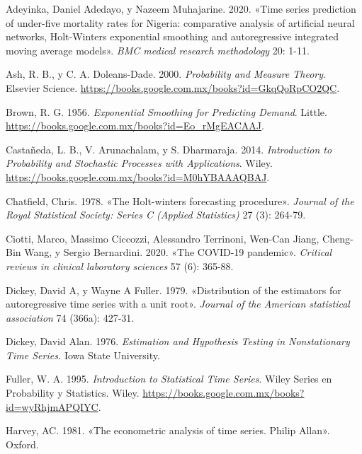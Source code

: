 \documentclass[
  us-letterpaper,
]{scrreprt}
\newlength{\cslhangindent}
\newenvironment{CSLReferences}[2] %
 {\begin{list}{}{%
  \setlength{\itemindent}{0pt}
  \setlength{\leftmargin}{0pt}
  \setlength{\parsep}{0pt}
  \ifodd #1
   \setlength{\leftmargin}{\cslhangindent}
   \setlength{\itemindent}{-1\cslhangindent}
  \fi
  \setlength{\itemsep}{#2\baselineskip}}}
 {\end{list}}
\theoremstyle{plain}
\theoremstyle{definition}
\theoremstyle{definition}
\theoremstyle{plain}
\theoremstyle{remark}
\begin{document}
\label{refs}
\begin{CSLReferences}{1}{0}
Adeyinka, Daniel Adedayo, y Nazeem Muhajarine. 2020. {«Time series
prediction of under-five mortality rates for Nigeria: comparative
analysis of artificial neural networks, Holt-Winters exponential
smoothing and autoregressive integrated moving average models»}.
\emph{BMC medical research methodology} 20: 1-11.

Ash, R. B., y C. A. Doleans-Dade. 2000. \emph{Probability and Measure
Theory}. Elsevier Science.
\url{https://books.google.com.mx/books?id=GkqQoRpCO2QC}.

Brown, R. G. 1956. \emph{Exponential Smoothing for Predicting Demand}.
Little. \url{https://books.google.com.mx/books?id=Eo_rMgEACAAJ}.

Castañeda, L. B., V. Arunachalam, y S. Dharmaraja. 2014.
\emph{Introduction to Probability and Stochastic Processes with
Applications}. Wiley.
\url{https://books.google.com.mx/books?id=M0hYBAAAQBAJ}.

Chatfield, Chris. 1978. {«The Holt-winters forecasting procedure»}.
\emph{Journal of the Royal Statistical Society: Series C (Applied
Statistics)} 27 (3): 264-79.

Ciotti, Marco, Massimo Ciccozzi, Alessandro Terrinoni, Wen-Can Jiang,
Cheng-Bin Wang, y Sergio Bernardini. 2020. {«The COVID-19 pandemic»}.
\emph{Critical reviews in clinical laboratory sciences} 57 (6): 365-88.

Dickey, David A, y Wayne A Fuller. 1979. {«Distribution of the
estimators for autoregressive time series with a unit root»}.
\emph{Journal of the American statistical association} 74 (366a):
427-31.

Dickey, David Alan. 1976. \emph{Estimation and Hypothesis Testing in
Nonstationary Time Series.} Iowa State University.

Fuller, W. A. 1995. \emph{Introduction to Statistical Time Series}.
Wiley Series en Probability y Statistics. Wiley.
\url{https://books.google.com.mx/books?id=wyRhjmAPQIYC}.

Harvey, AC. 1981. {«The econometric analysis of time series. Philip
Allan»}. Oxford.


\end{CSLReferences}
\end{document}
